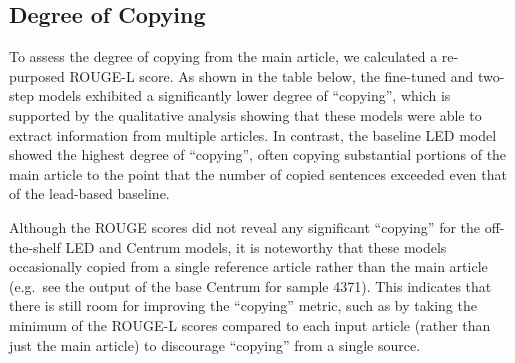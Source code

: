 \documentclass[12pt, twocolumn]{article}
\numberwithin{equation}{section}
\begin{document}
\subsection{Degree of Copying}
\label{ssec:results-copy}

To assess the degree of copying from the main article, we calculated a re-purposed ROUGE-L score. As shown in the table below, the fine-tuned and two-step models exhibited a significantly lower degree of ``copying'', which is supported by the qualitative analysis showing that these models were able to extract information from multiple articles. In contrast, the baseline LED model showed the highest degree of ``copying'', often copying substantial portions of the main article to the point that the number of copied sentences exceeded even that of the lead-based baseline.

Although the ROUGE scores did not reveal any significant ``copying'' for the off-the-shelf LED and Centrum models, it is noteworthy that these models occasionally copied from a single reference article rather than the main article (e.g.~see the output of the base Centrum for sample 4371). This indicates that there is still room for improving the ``copying'' metric, such as by taking the minimum of the ROUGE-L scores compared to each input article (rather than just the main article) to discourage ``copying'' from a single source.
\end{document}

